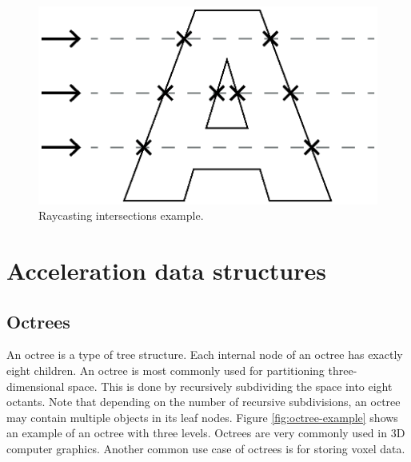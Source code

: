 \begin{figure}[h]
    \centering
    \includegraphics[scale=0.8]{sections/theory/figures/raycast-intersections}
    \caption{Raycasting intersections example.}
    \label{fig:raycasting-intersections-example}
\end{figure}

\section{Acceleration data structures}
\subsection{Octrees}
An octree is a type of tree structure. Each internal node of an octree has exactly eight children. An octree is most commonly used for partitioning three-dimensional space. This is done by recursively subdividing the space into eight octants. Note that depending on the number of recursive subdivisions, an octree may contain multiple objects in its leaf nodes. Figure \ref{fig:octree-example} shows an example of an octree with three levels. Octrees are very commonly used in 3D computer graphics. Another common use case of octrees is for storing voxel data. 

